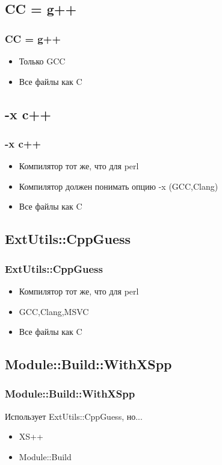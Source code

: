 \documentclass[pdflatex,hyperref={unicode=true}]{beamer}
\DeclareRobustCommand{\cpp}{
    \texorpdfstring{\hbox{C\hspace{-0.5ex}\protect\raisebox{0.5ex}{\protect\scalebox{0.67}{++}}}}{C++}
}
\begin{document}
\subsection{CC = g++}
\begin{frame}[t,fragile]
    \frametitle{CC = g++}
    
    \begin{itemize}
        \item Только GCC
        \item Все файлы как \cpp 
    \end{itemize}
\end{frame}

\subsection{-x c++}
\begin{frame}[t,fragile]
    \frametitle{-x c++}
    
    \begin{itemize}
        \item Компилятор тот же, что для perl
        \item Компилятор должен понимать опцию -x (GCC,Clang)
        \item Все файлы как \cpp 
    \end{itemize}
\end{frame}

\subsection{ExtUtils::CppGuess}
\begin{frame}[t,fragile]
    \frametitle{ExtUtils::CppGuess}
    
    \begin{itemize}
        \item Компилятор тот же, что для perl
        \item GCC,Clang,MSVC
        \item Все файлы как \cpp 
    \end{itemize}
\end{frame}

\subsection{Module::Build::WithXSpp}
\begin{frame}[t]
    \frametitle{Module::Build::WithXSpp}
    Использует ExtUtils::CppGuess, но...
    \begin{itemize}
        \item XS++
        \item Module::Build
    \end{itemize}
\end{frame}
\end{document}
